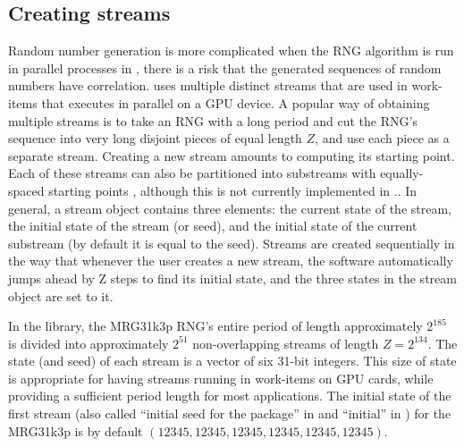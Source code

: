 \documentclass[article,nojss]{jss}\usepackage[]{graphicx}\usepackage[]{color}
\begin{document}
\subsection{Creating streams}\label{createstreams}
Random number generation is more complicated when the RNG algorithm is run in parallel processes in , there is a risk that the generated sequences of random numbers have correlation.  uses multiple distinct streams that are used in work-items that executes in parallel on a GPU device. A popular way of obtaining multiple streams is to take an RNG with a long period and cut the RNG's sequence into very long disjoint pieces of equal length $Z$, and use each piece as a separate stream. Creating a new stream amounts to computing its starting point. Each of these streams can also be partitioned into substreams with equally-spaced starting points \citep{l2002object, rLEC15a}, although this is not currently implemented in .. In general, a stream object contains three elements: the current state of the stream, the initial state of the stream (or seed), and the initial state of the current substream (by default it is equal to the seed). Streams are created sequentially in the way that whenever the user creates a new stream, the software automatically jumps ahead by Z steps to find its initial state, and the three states in the stream object are set to it. 

In the  library, the MRG31k3p RNG's entire period of length approximately $2^{185}$ is divided into approximately $2^{51}$ non-overlapping streams of length $Z = 2^{134}$. %
The state (and seed) of each stream is a vector of six 31-bit integers. This size of state is appropriate for having streams running in work-items on GPU cards, while providing a sufficient period length for most applications. The initial state of the first stream (also called ``initial seed for the package'' in  and ``initial'' in ) for the MRG31k3p is by default $(12345, 12345, 12345, 12345, 12345, 12345)$. 
\end{document}
